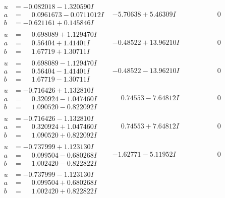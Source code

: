 \documentclass[1p]{elsarticle_modified}
\theoremstyle{definition}
\begin{document}
$$\begin{array}{c|c|c}
\begin{aligned}
u &= -0.082018 - 1.320590 I \\
a &= \phantom{-}0.0961673 - 0.0711012 I \\
b &= -0.621161 + 0.145846 I\end{aligned}
 & -5.70638 + 5.46309 I & \phantom{-0.000000 } 0 \\ \hline\begin{aligned}
u &= \phantom{-}0.698089 + 1.129470 I \\
a &= \phantom{-}0.56404 + 1.41401 I \\
b &= \phantom{-}1.67719 + 1.30711 I\end{aligned}
 & -0.48522 + 13.96210 I & \phantom{-0.000000 } 0 \\ \hline\begin{aligned}
u &= \phantom{-}0.698089 - 1.129470 I \\
a &= \phantom{-}0.56404 - 1.41401 I \\
b &= \phantom{-}1.67719 - 1.30711 I\end{aligned}
 & -0.48522 - 13.96210 I & \phantom{-0.000000 } 0 \\ \hline\begin{aligned}
u &= -0.716426 + 1.132810 I \\
a &= \phantom{-}0.320924 - 1.047460 I \\
b &= \phantom{-}1.090520 - 0.822092 I\end{aligned}
 & \phantom{-}0.74553 - 7.64812 I & \phantom{-0.000000 } 0 \\ \hline\begin{aligned}
u &= -0.716426 - 1.132810 I \\
a &= \phantom{-}0.320924 + 1.047460 I \\
b &= \phantom{-}1.090520 + 0.822092 I\end{aligned}
 & \phantom{-}0.74553 + 7.64812 I & \phantom{-0.000000 } 0 \\ \hline\begin{aligned}
u &= -0.737999 + 1.123130 I \\
a &= \phantom{-}0.099504 - 0.680268 I \\
b &= \phantom{-}1.002420 - 0.822822 I\end{aligned}
 & -1.62771 - 5.11952 I & \phantom{-0.000000 } 0 \\ \hline\begin{aligned}
u &= -0.737999 - 1.123130 I \\
a &= \phantom{-}0.099504 + 0.680268 I \\
b &= \phantom{-}1.002420 + 0.822822 I\end{aligned}

\end{array}$$
\end{document}
